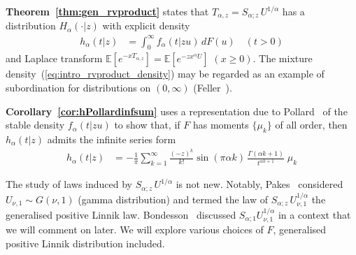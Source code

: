 \documentclass[a4paper,12pt]{article}
\begin{document}
{\bf Theorem~\ref{thm:gen_rvproduct}} states that $T_{\alpha,z}=S_{\alpha;z} \, U^{1/\alpha}$  has a distribution 
$H_\alpha(\cdot \vert z)$ with explicit density
\begin{align}
h_\alpha(t \vert z)
&=  \int_0^\infty  f_\alpha(t \vert z u) \, dF(u)  \quad (t>0)%
\label{eq:intro_rvproduct_density}
\end{align}
and  Laplace transform %
$\mathbb{E}\left[e^{-xT_{\alpha,z}}\right] =\mathbb{E}\left[e^{-zx^\alpha U}\right]$ $(x\ge0)$.
The mixture density~(\ref{eq:intro_rvproduct_density}) may  be regarded  as an example of 
subordination  for distributions on $(0,\infty)$ (Feller~\cite[XIII.7({$e$})]{Feller2}).

{\bf Corollary~\ref{cor:hPollardinfsum}} uses a  representation due to  Pollard~\cite{Pollard}  of the stable density  $f_\alpha(t \vert z u)$ 
 to show that,  if $F$ has   moments $\{\mu_k\}$ of all order,
then $h_\alpha(t \vert z)$  admits the infinite series form
\begin{align}
h_\alpha(t\vert z)
 &= -\frac{1}{\pi} \sum_{k=1}^\infty \frac{(-z)^k}{k!} \sin(\pi\alpha k) \,\frac{\Gamma(\alpha k+1)}{t^{\alpha k+1}} \;  \mu_k 
\label{eq:intro_hPollardinfsum} 
\end{align}

The study of  laws induced by $S_{\alpha;z} \, U^{1/\alpha}$  is not new. %
Notably, Pakes~\cite[(4.4)]{Pakes95} considered   $U_{\nu,1}\sim G(\nu,1)$ (gamma distribution) 
and termed the  law of $S_{\alpha;z} \, U_{\nu,1}^{1/\alpha}$  the generalised positive  Linnik law.
Bondesson~\cite[3.2.4(p38)]{Bondesson} discussed  $S_{\alpha;1} U_{\nu,1}^{1/\alpha}$ in a context that  
we will  comment on  later.
We will explore various  choices of $F$,  generalised positive Linnik  distribution included.
\end{document}
